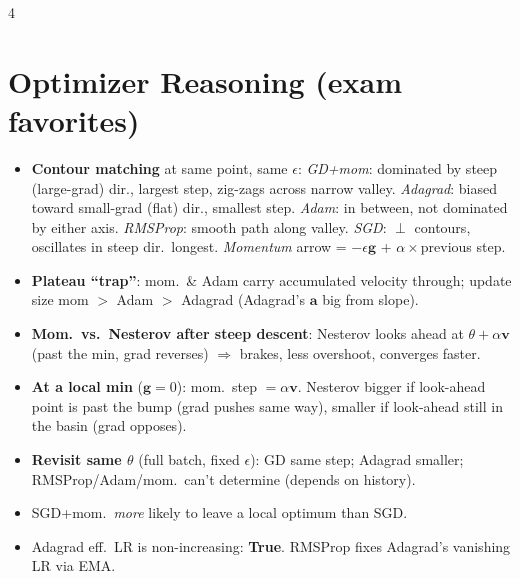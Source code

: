 \documentclass[8pt,landscape]{extarticle}
\newcommand{\g}{\mathbf{g}}
\newcommand{\vv}{\mathbf{v}}
\newcommand{\av}{\mathbf{a}}
\begin{document}
\begin{multicols*}{4}
\section{Optimizer Reasoning (exam favorites)}
\begin{itemize}
\item \textbf{Contour matching} at same point, same $\epsilon$: \emph{GD+mom}: dominated by steep (large-grad) dir., largest step, zig-zags across narrow valley. \emph{Adagrad}: biased toward small-grad (flat) dir., smallest step. \emph{Adam}: in between, not dominated by either axis. \emph{RMSProp}: smooth path along valley. \emph{SGD}: $\perp$ contours, oscillates in steep dir.\ longest. \emph{Momentum} arrow = $-\epsilon\g$ + $\alpha\times$previous step.
\item \textbf{Plateau ``trap''}: mom.\ \& Adam carry accumulated velocity through; update size mom $>$ Adam $>$ Adagrad (Adagrad's $\av$ big from slope).
\item \textbf{Mom.\ vs.\ Nesterov after steep descent}: Nesterov looks ahead at $\theta+\alpha\vv$ (past the min, grad reverses) $\Rightarrow$ brakes, less overshoot, converges faster.
\item \textbf{At a local min} ($\g=0$): mom.\ step $=\alpha\vv$. Nesterov bigger if look-ahead point is past the bump (grad pushes same way), smaller if look-ahead still in the basin (grad opposes).
\item \textbf{Revisit same $\theta$} (full batch, fixed $\epsilon$): GD same step; Adagrad smaller; RMSProp/Adam/mom.\ can't determine (depends on history).
\item SGD+mom.\ \emph{more} likely to leave a local optimum than SGD.
\item Adagrad eff.\ LR is non-increasing: \textbf{True}. RMSProp fixes Adagrad's vanishing LR via EMA.
\end{itemize}


\end{multicols*}
\end{document}
